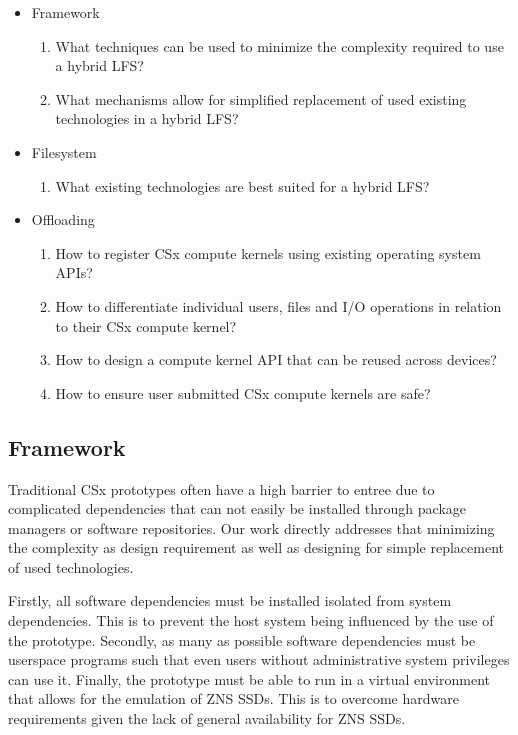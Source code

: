 \begin{itemize}
    \item Framework
    \begin{enumerate}
        \item What techniques can be used to minimize the complexity required to
            use a hybrid LFS?
        \item What mechanisms allow for simplified replacement of used existing
            technologies in a hybrid LFS?
    \end{enumerate}
    \item Filesystem
    \begin{enumerate}
        \item What existing technologies are best suited for a hybrid LFS?
    \end{enumerate}
    \item Offloading
    \begin{enumerate}
        \item How to register CSx compute kernels using existing operating
            system APIs?
        \item How to differentiate individual users, files and I/O operations in
            relation to their CSx compute kernel?
        \item How to design a compute kernel API that can be reused across devices?
        \item How to ensure user submitted CSx compute kernels are safe?
    \end{enumerate}
\end{itemize}

\subsection{Framework}

Traditional CSx prototypes often have a high barrier to entree due to
complicated dependencies that can not easily be installed through package
managers or software repositories. Our work directly addresses that minimizing
the complexity as design requirement as well as designing for simple
replacement of used technologies.

Firstly, all software dependencies must be installed isolated from system
dependencies. This is to prevent the host system being influenced by the use
of the prototype. Secondly, as many as possible software dependencies must be
userspace programs such that even users without administrative system
privileges can use it. Finally, the prototype must be able to run in a virtual
environment that allows for the emulation of ZNS SSDs. This is to overcome
hardware requirements given the lack of general availability for ZNS SSDs.

